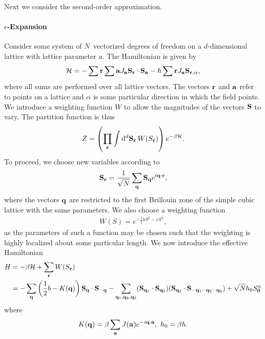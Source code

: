 Next we consider the second-order approximation.

\paragraph{$\epsilon$-Expansion}
Consider some system of $N$ vectorized degrees of freedom on a $d$-dimensional lattice with lattice parameter $a$. The  Hamiltonian is given by
\begin{align*}
	\mathcal{H} = -\sum\limits{\vb{r}}\sum\limits{\vb{a}}J_{\vb{a}}\vb{S}_{\vb{r}}\cdot\vb{S}_{\vb{a}} - h\sum\limits{\vb{r}}J_{\vb{a}}\vb{S}_{\vb{r}, \alpha},
\end{align*}
where all sums are performed over all lattice vectors. The vectors $\vb{r}$ and $\vb{a}$ refer to points on a lattice and $\alpha$ is some particular direction in which the field points. We introduce a weighting function $W$ to allow the magnitudes of the vectors $\vb{S}$ to vary. The partition function is thus
\begin{align*}
	Z = \left(\prod\limits_{\vb{r}}\int\limits_{}^{}\dd[d]{\vb{S}_{\vb{r}}}W(S_{\vb{r}})\right)e^{-\beta\mathcal{H}}.
\end{align*}
To proceed, we choose new variables according to
\begin{align*}
	\vb{S}_{\vb{r}} = \frac{1}{\sqrt{N}}\sum\limits_{\vb{q}}\vb{S}_{\vb{q}}e^{i\vb{q}\cdot\vb{r}},
\end{align*}
where the vectors $\vb{q}$ are restricted to the first Brillouin zone of the simple cubic lattice with the same parameters. We also choose a weighting function
\begin{align*}
	W(S) = e^{-\frac{1}{2}bS^{2} - cS^{4}},
\end{align*}
as the parameters of such a function may be chosen such that the weighting is highly localized about some particular length. We now introduce the effective Hamiltonian
\begin{align*}
	H &= -\beta\mathcal{H} + \sum\limits_{\vb{r}}W(S_{\vb{r}}) \\
	  &= -\sum\limits_{\vb{q}}\left(\frac{1}{2}b - K(\vb{q})\right)\vb{S}_{\vb{q}}\cdot\vb{S}_{-\vb{q}} - \sum\limits_{\vb{q}_{1}, \vb{q}_{2}, \vb{q}_{3}}(\vb{S}_{\vb{q}_{1}}\cdot\vb{S}_{\vb{q}_{2}})(\vb{S}_{\vb{q}_{3}}\cdot\vb{S}_{-\vb{q}_{1} - \vb{q}_{2} - \vb{q}_{3}}) + \sqrt{N}h_{0}S_{\vb{0}}^{\alpha}
\end{align*}
where
\begin{align*}
	K(\vb{q}) = \beta\sum\limits_{\vb{a}}J(\vb{a})e^{-i\vb{q}\cdot\vb{a}},\ h_{0} = \beta h.
\end{align*}

